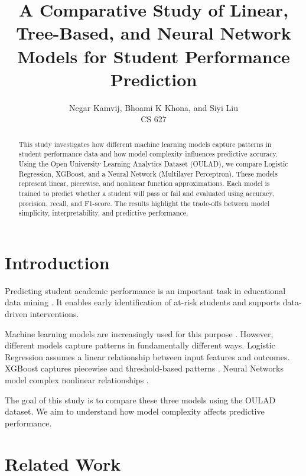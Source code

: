\documentclass[conference]{IEEEtran}
\begin{document}
\title{A Comparative Study of Linear, Tree-Based, and Neural Network Models for Student Performance Prediction}

\author{
Negar Kamvij, Bhoami K Khona, and Siyi Liu\\
CS 627
}

\maketitle

\begin{abstract}
This study investigates how different machine learning models capture patterns in student performance data and how model complexity influences predictive accuracy. Using the Open University Learning Analytics Dataset (OULAD), we compare Logistic Regression, XGBoost, and a Neural Network (Multilayer Perceptron). These models represent linear, piecewise, and nonlinear function approximations. Each model is trained to predict whether a student will pass or fail and evaluated using accuracy, precision, recall, and F1-score. The results highlight the trade-offs between model simplicity, interpretability, and predictive performance.
\end{abstract}

\section{Introduction}

Predicting student academic performance is an important task in educational data mining \cite{nayak2023}. It enables early identification of at-risk students and supports data-driven interventions.

Machine learning models are increasingly used for this purpose \cite{chen2015}. However, different models capture patterns in fundamentally different ways. Logistic Regression assumes a linear relationship between input features and outcomes. XGBoost captures piecewise and threshold-based patterns \cite{ki2026}. Neural Networks model complex nonlinear relationships \cite{chong2025}.

The goal of this study is to compare these three models using the OULAD dataset. We aim to understand how model complexity affects predictive performance.

\section{Related Work}
\end{document}
